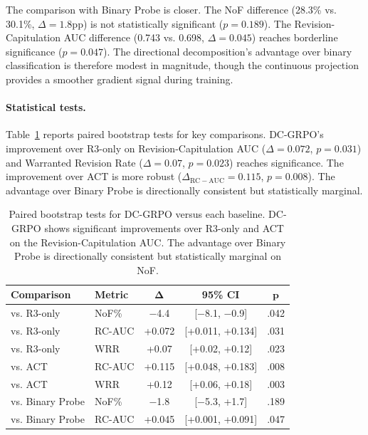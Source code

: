\documentclass[11pt,a4paper]{article}
\begin{document}
The comparison with Binary Probe is closer. The NoF difference (28.3\% vs. 30.1\%, $\Delta = 1.8$pp) is not statistically significant ($p = 0.189$). The Revision-Capitulation AUC difference (0.743 vs. 0.698, $\Delta = 0.045$) reaches borderline significance ($p = 0.047$). The directional decomposition's advantage over binary classification is therefore modest in magnitude, though the continuous projection provides a smoother gradient signal during training.

\paragraph{Statistical tests.} Table~\ref{tab:pairwise} reports paired bootstrap tests for key comparisons. DC-GRPO's improvement over R3-only on Revision-Capitulation AUC ($\Delta = 0.072$, $p = 0.031$) and Warranted Revision Rate ($\Delta = 0.07$, $p = 0.023$) reaches significance. The improvement over ACT is more robust ($\Delta_{\mathrm{RC-AUC}} = 0.115$, $p = 0.008$). The advantage over Binary Probe is directionally consistent but statistically marginal.

\begin{table}[t]
\centering
\small
\begin{tabular}{llccc}
\toprule
\textbf{Comparison} & \textbf{Metric} & $\boldsymbol{\Delta}$ & \textbf{95\% CI} & $\boldsymbol{p}$ \\
\midrule
vs. R3-only     & NoF\%   & $-$4.4  & [$-$8.1, $-$0.9] & .042 \\
vs. R3-only     & RC-AUC  & +0.072 & [+0.011, +0.134] & .031 \\
vs. R3-only     & WRR     & +0.07  & [+0.02, +0.12]   & .023 \\
vs. ACT         & RC-AUC  & +0.115 & [+0.048, +0.183] & .008 \\
vs. ACT         & WRR     & +0.12  & [+0.06, +0.18]   & .003 \\
vs. Binary Probe & NoF\%   & $-$1.8  & [$-$5.3, +1.7]    & .189 \\
vs. Binary Probe & RC-AUC  & +0.045 & [+0.001, +0.091] & .047 \\
\bottomrule
\end{tabular}
\caption{Paired bootstrap tests for DC-GRPO versus each baseline. DC-GRPO shows significant improvements over R3-only and ACT on the Revision-Capitulation AUC. The advantage over Binary Probe is directionally consistent but statistically marginal on NoF.}
\label{tab:pairwise}
\end{table}
\end{document}
